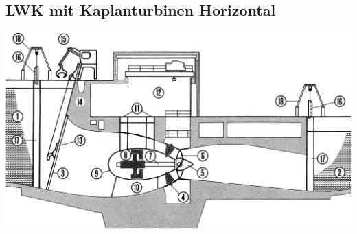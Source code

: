 \subsection{LWK mit Kaplanturbinen Horizontal}

\begin{center}
    \includegraphics[width=0.95\columnwidth, align=c]{images/Laufwasserkraftwerke_Kaplanturbine_Horizontal.png}
\end{center}

